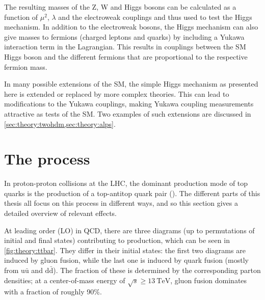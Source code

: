 The resulting masses of the Z, W and Higgs bosons can be calculated as a function of $\mu^2$, $\lambda$ and the electroweak couplings and thus used to test the Higgs mechanism. In addition to the electroweak bosons, the Higgs mechanism can also give masses to fermions (charged leptons and quarks) by including a Yukawa interaction term in the Lagrangian. This results in couplings between the SM Higgs boson and the different fermions that are proportional to the respective fermion mass. 

In many possible extensions of the SM, the simple Higgs mechanism as presented here is extended or replaced by more complex theories. This can lead to modifications to the Yukawa couplings, making Yukawa coupling measurements attractive as tests of the SM. Two examples of such extensions are discussed in \cref{sec:theory:twohdm,sec:theory:alps}.

\section{The \texorpdfstring{\pptt}{pp -> tt} process}
\label{sec:theory:ttbar}

In proton-proton collisions at the LHC, the dominant production mode of top quarks is the production of a top-antitop quark pair (\ttbar). The different parts of this thesis all focus on this process in different ways, and so this section gives a detailed overview of relevant effects.

At leading order (LO) in QCD, there are three diagrams (up to permutations of initial and final states) contributing to \ttbar production, which can be seen in \cref{fig:theory:ttbar}. They differ in their initial states: the first two diagrams are induced by gluon fusion, while the last one is induced by quark fusion (mostly from $\mathrm{u \bar{u}}$ and $\mathrm{d \bar{d}}$). The fraction of these is determined by the corresponding parton densities; at a center-of-mass energy of $\sqrt{s} \geq \SI{13}{\TeV}$, gluon fusion dominates with a fraction of roughly 90\%.

